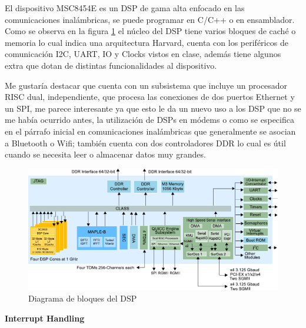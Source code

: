 \documentclass[11pt,a4paper]{article}
\begin{document}

El dispositivo MSC8454E es un DSP de gama alta enfocado en las comunicaciones inalámbricas, se puede programar en C/C++ o en ensamblador. Como se observa en la figura \ref{fig:diagram_block} el núcleo del DSP tiene varios bloques de caché o memoria lo cual indica una arquitectura Harvard, cuenta con los periféricos de comunicación I2C, UART, IO y Clocks vistos en clase, además tiene algunos extra que dotan de distintas funcionalidades al dispositivo. 

Me gustaría destacar que cuenta con un subsistema que incluye un procesador RISC dual, independiente, que procesa las conexiones de dos puertos Ethernet y un SPI, me parece interesante ya que esto le da un nuevo uso a los DSP que no se me había ocurrido antes, la utilización de DSPs en módems o como se especifica en el párrafo inicial en comunicaciones inalámbricas que generalmente se asocian a Bluetooth o Wifi; también cuenta con dos controladores DDR lo cual es útil cuando se necesita leer o almacenar datos muy grandes. 

\begin{figure}[H]
    \centering
    \includegraphics[scale=0.8]{images/diagram_block.pdf}
    \caption{Diagrama de bloques del DSP}
    \label{fig:diagram_block}
\end{figure}

{\Large \textbf{Interrupt Handling}}
\end{document}
